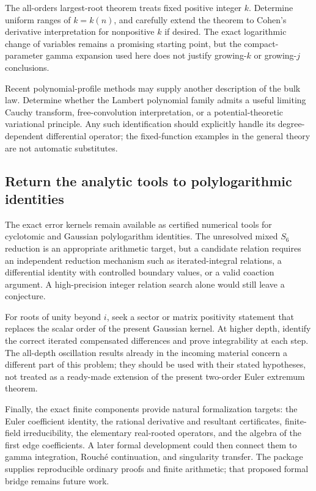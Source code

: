 The all-orders largest-root theorem treats fixed positive integer $k$.
Determine uniform ranges of $k=k(n)$, and carefully extend the theorem
to Cohen's derivative interpretation for nonpositive $k$ if desired.
The exact logarithmic change of variables remains a promising starting
point, but the compact-parameter gamma expansion used here does not
justify growing-$k$ or growing-$j$ conclusions.

Recent polynomial-profile methods \cite{JalowyKabluchkoMarynych2026}
may supply another description of the bulk law. Determine whether the
Lambert polynomial family admits a useful limiting Cauchy transform,
free-convolution interpretation, or a potential-theoretic variational
principle. Any such identification should explicitly handle its
degree-dependent differential operator; the fixed-function examples
in the general theory are not automatic substitutes.

\subsection{Return the analytic tools to polylogarithmic identities}

The exact error kernels remain available as certified numerical tools
for cyclotomic and Gaussian polylogarithm identities. The unresolved
mixed $S_6$ reduction is an appropriate arithmetic target, but a
candidate relation requires an independent reduction mechanism such
as iterated-integral relations, a differential identity with controlled
boundary values, or a valid coaction argument. A high-precision integer
relation search alone would still leave a conjecture.

For roots of unity beyond $i$, seek a sector or matrix positivity
statement that replaces the scalar order of the present Gaussian
kernel. At higher depth, identify the correct iterated compensated
differences and prove integrability at each step. The all-depth
oscillation results already in the incoming material concern a
different part of this problem; they should be used with their stated
hypotheses, not treated as a ready-made extension of the present
two-order Euler extremum theorem.

Finally, the exact finite components provide natural formalization
targets: the Euler coefficient identity, the rational derivative and
resultant certificates, finite-field irreducibility, the elementary
real-rooted operators, and the algebra of the first edge coefficients.
A later formal development could then connect them to gamma
integration, Rouch\'e continuation, and singularity transfer. The
package supplies reproducible ordinary proofs and finite arithmetic;
that proposed formal bridge remains future work.
